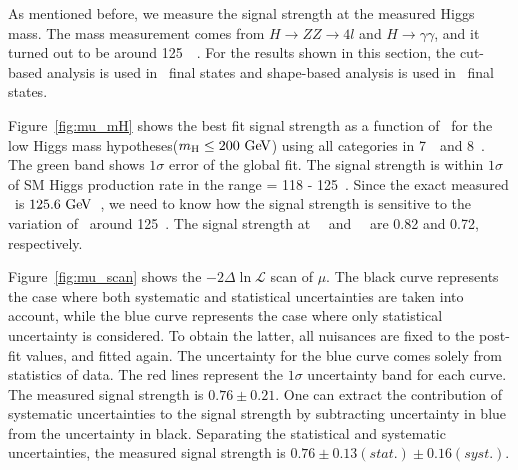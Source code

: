 As mentioned before, we measure the signal strength at the 
measured Higgs mass. The mass measurement comes from 
$H\rightarrow ZZ\rightarrow4l$ and $H\rightarrow \gamma\gamma$, 
and it turned out to be around 125~\GeV~\cite{Chatrchyan:1637951, CMS-PAS-HIG-13-001}. 
For the results shown in this section,   
the cut-based analysis is used in \SF\ final states 
and shape-based analysis is used in \DF\ final states. 

Figure~\ref{fig:mu_mH} shows the best fit signal strength 
as a function of \mHi\ for the low Higgs mass hypotheses($m_{\mathrm{H}}\le200~\mathrm{Ge\kern -0.1em V}$)
using all categories in 7~\TeV\ and 8~\TeV. 
The green band shows $1\sigma$ error of the global fit. 
The signal strength is within $1\sigma$ of SM Higgs production rate 
in the range \mHi = 118 - 125~\GeV. 
Since the exact measured \mHi\ is $125.6~\mathrm{Ge\kern -0.1em V}$~\cite{Chatrchyan:1637951}, 
we need to know how the signal strength is sensitive to the 
variation of \mHi\ around 125~\GeV. 
The signal strength at ~\GeV\ and ~\GeV\ are 0.82 and 0.72, respectively.

Figure~\ref{fig:mu_scan} shows the  $- 2\Delta\ln \mathcal{L}$ scan of $\mu$. 
The black curve represents the case where both systematic and statistical 
uncertainties are taken into account, while the blue curve represents the case 
where only statistical uncertainty is considered. To obtain the latter,  
all nuisances are fixed to the post-fit values, and fitted again.  
The uncertainty for the blue curve comes solely from statistics of data. 
The red lines represent the $1\sigma$ uncertainty band for each curve. 
The measured signal strength is $0.76 \pm 0.21$.  
One can extract the contribution of systematic uncertainties to the signal strength
by subtracting uncertainty in blue from the uncertainty in black.
Separating the statistical and systematic uncertainties, 
the measured signal strength is $0.76 \pm 0.13(stat.) \pm 0.16(syst.)$.  

